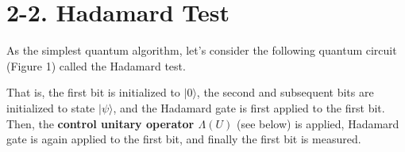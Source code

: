 \section{2-2. Hadamard Test}

As the simplest quantum algorithm, let's consider the following quantum circuit (Figure
1) called the Hadamard test. 

That is, the first bit is initialized to $|0\rangle$, the second and subsequent bits are initialized to state $|\psi\rangle$, and the Hadamard gate is first applied to the first bit. Then, the \textbf{control unitary operator $\Lambda(U)$} (see below) is applied, Hadamard gate is again applied to the first bit, and finally the first bit is measured.

